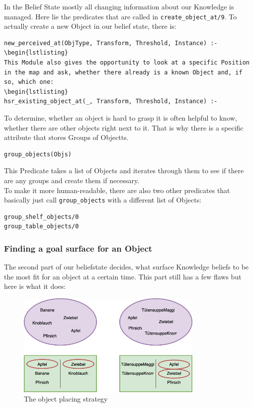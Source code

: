 \documentclass[main.tex]{subfiles}
\begin{document}
In the Belief State mostly all changing information about our Knowledge is managed. Here lie the predicates that are called in \texttt{create\_object\_at/9}. To actually create a new Object in our belief state, there is:
\begin{lstlisting}
new_perceived_at(ObjType, Transform, Threshold, Instance) :-
\begin{lstlisting}
This Module also gives the opportunity to look at a specific Position in the map and ask, whether there already is a known Object and, if so, which one:
\begin{lstlisting}
hsr_existing_object_at(_, Transform, Threshold, Instance) :-
\end{lstlisting}
To determine, whether an object is hard to grasp it is often helpful to know, whether there are other objects right next to it. That is why there is a specific attribute that stores Groups of Objectts. 
\begin{lstlisting}
group_objects(Objs)
\end{lstlisting}
This Predicate takes a list of Objects and iterates through them to see if there are any groups and create them if necessary.\\
To make it more human-readable, there are also two other predicates that basically just call \texttt{group\_objects} with a different list of Objects:
\begin{lstlisting}
group_shelf_objects/0
group_table_objects/0
\end{lstlisting}

\subsubsection{Finding a goal surface for an Object\label{sec:kn_find_surf}}

The second part of our beliefstate decides, what surface Knowledge beliefs to be the most fit for an object at a certain time. This part still has a few flaws but here is what it does:
\begin{figure}
\centering
\includegraphics[width=0.8\textwidth]{pictures/knowledge_placing_objects.png}
\caption{The object placing strategy}
\label{fig:kn_obj_placement}
\end{figure}
\end{document}
